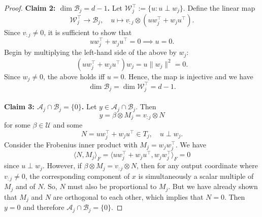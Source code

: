 \begin{proof}
    \noindent
    \textbf{Claim 2: $\dim \mathcal{B}_{j}=d-1$.}
    Let $\mathcal{W}_{j}^{\top}:=\{u: u\perp w_{j}\}$.
    Define the linear map
    \begin{equation}
        \mathcal{W}_{j}^{\top} \to \mathcal{B}_{j}, \quad u\mapsto v_{:j} \otimes (uw_{j}^{\top} + w_{j}u^{\top}).
    \end{equation}
    Since $v_{:j} \not = 0$, it is sufficient to show that
    \begin{equation}
        uw_{j}^{\top} + w_{j}u^{\top} =0 \implies u=0.
    \end{equation}
    Begin by multiplying the left-hand side of the above by $w_{j}$:
    \begin{equation}
        (uw_{j}^{\top} + w_{j}u^{\top})w_{j} = u \|w_{j}\|^{2} =0.
    \end{equation}
    Since $w_{j}\not =0$, the above holds iff $u=0$.
    Hence, the map is injective and we have
    \begin{equation}
        \dim \mathcal{B}_{j} = \dim \mathcal{W}_{j}^{\top} = d-1.
    \end{equation}
    \\
    \noindent
    \textbf{Claim 3: $\mathcal{A}_{j} \cap \mathcal{B}_{j}=\{0\}$.}
    Let $y \in \mathcal{A}_{j} \cap \mathcal{B}_{j}$.
    Then
    \begin{equation}
        y = \beta \otimes M_{j} = v_{:j} \otimes N
    \end{equation}
    for some $\beta \in \mathcal{U}$ and some
    \begin{equation}
        N= uw_{j}^{\top} + w_{j}u^{\top}\in T_{j}, \quad u \perp w_{j}.
    \end{equation}
    Consider the Frobenius inner product with $M_{j}= w_{j} w_{j}^{\top}$.
    We have
    \begin{equation}
        \langle N,M_{j} \rangle_{F} = \langle uw_{j}^{\top} + w_{j}u^{\top}, w_{j}w_{j}^{\top} \rangle_{F} =0
    \end{equation}
    since $u \perp w_{j}$.
    However, if $\beta \otimes M_{j} = v_{:j} \otimes N$, then for any output coordinate where $v_{:j} \not =0$, the corresponding component of $x$ is simultaneously a scalar multiple of $M_{j}$ and of $N$.
    So, $N$ must also be proportional to $M_{j}$.
    But we have already shown that $M_{j}$ and $N$ are orthogonal to each other, which implies that $N=0$.
    Then $y=0$ and therefore $\mathcal{A}_{j} \cap \mathcal{B}_{j} = \{0\}$.
\end{proof}

